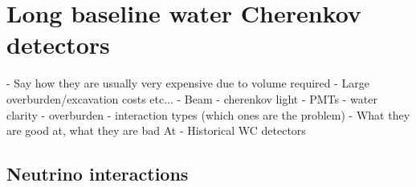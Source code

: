 \chapter{Long baseline water Cherenkov detectors}
\label{chap:wc}

- Say how they are usually very expensive due to volume required
- Large overburden/excavation costs etc...
- Beam
- cherenkov light
- PMTs
- water clarity
- overburden
- interaction types (which ones are the problem)
- What they are good at, what they are bad At
- Historical WC detectors

\section{Neutrino interactions}
\label{sec:theory_interactions}

